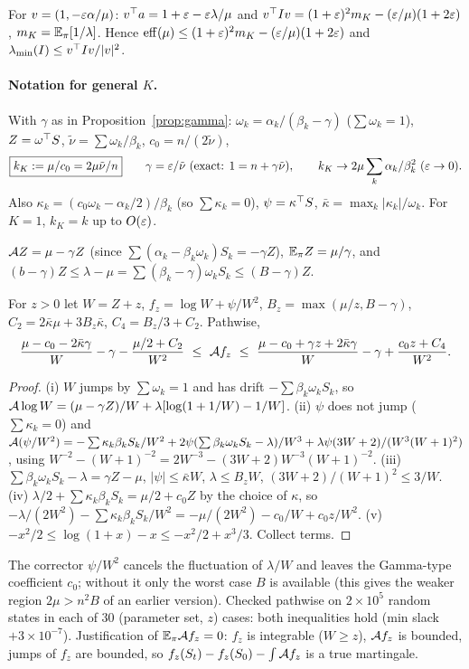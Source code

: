 \begin{proposition}\label{prop:ridge}\Pt{}
For $v=(1,-\varepsilon\alpha/\mu)$: $v^{\top} a=1+\varepsilon-\varepsilon\lambda/\mu$ and $v^{\top} Iv=(1+\varepsilon)^2m_K-(\varepsilon/\mu)(1+2\varepsilon)$, $m_K=\mathbb{E}_\pi[1/\lambda]$. Hence $\mathrm{eff}(\mu)\le(1+\varepsilon)^2m_K-(\varepsilon/\mu)(1+2\varepsilon)$ and $\lambda_{\min}(I)\le v^{\top} Iv/|v|^2$.
\end{proposition}

\paragraph{Notation for general $K$.}
With $\gamma$ as in Proposition~\ref{prop:gamma}: $\omega_k=\alpha_k/(\beta_k-\gamma)$ ($\sum\omega_k=1$), $Z=\omega^{\top} S$, $\tilde\nu=\sum\omega_k/\beta_k$, $c_0=n/(2\tilde\nu)$,
\[
\boxed{k_K:=\mu/c_0=2\mu\tilde\nu/n}\qquad\gamma=\eps/\tilde\nu\ \text{(exact: }1=n+\gamma\tilde\nu),\qquad k_K\to2\mu\sum_k\alpha_k/\beta_k^2\ (\eps\to0).
\]
Also $\kappa_k=(c_0\omega_k-\alpha_k/2)/\beta_k$ (so $\sum\kappa_k=0$), $\psi=\kappa^{\top} S$, $\bar\kappa=\max_k|\kappa_k|/\omega_k$. For $K=1$, $k_K=k$ up to $O(\varepsilon)$.

\begin{lemma}\label{lem:G}\Pt{}
$\mathcal A Z=\mu-\gamma Z$ (since $\sum(\alpha_k-\beta_k\omega_k)S_k=-\gamma Z$), $\mathbb{E}_\pi Z=\mu/\gamma$, and $(b-\gamma)Z\le\lambda-\mu=\sum(\beta_k-\gamma)\omega_kS_k\le(B-\gamma)Z$.
\end{lemma}

\begin{lemma}\label{lem:H}\Pt{}
For $z>0$ let $W=Z+z$, $f_z=\log W+\psi/W^2$, $B_z=\max(\mu/z,B-\gamma)$, $C_2=2\bar\kappa\mu+3B_z\bar\kappa$, $C_4=B_z/3+C_2$. Pathwise,
\[
\frac{\mu-c_0-2\bar\kappa\gamma}{W}-\gamma-\frac{\mu/2+C_2}{W^2}\ \le\ \cA f_z\ \le\ \frac{\mu-c_0+\gamma z+2\bar\kappa\gamma}{W}-\gamma+\frac{c_0z+C_4}{W^2}.
\]
\end{lemma}
\begin{proof}
(i) $W$ jumps by $\sum\omega_k=1$ and has drift $-\sum\beta_k\omega_kS_k$, so $\mathcal A\log W=(\mu-\gamma Z)/W+\lambda[\log(1+1/W)-1/W]$.
(ii) $\psi$ does not jump ($\sum\kappa_k=0$) and
$\mathcal A(\psi/W^2)=-\sum\kappa_k\beta_kS_k/W^2+2\psi(\sum\beta_k\omega_kS_k-\lambda)/W^3+\lambda\psi(3W+2)/(W^3(W+1)^2)$, using $W^{-2}-(W+1)^{-2}=2W^{-3}-(3W+2)W^{-3}(W+1)^{-2}$.
(iii) $\sum\beta_k\omega_kS_k-\lambda=\gamma Z-\mu$, $|\psi|\le\bar\kappa W$, $\lambda\le B_zW$, $(3W+2)/(W+1)^2\le3/W$.
(iv) $\lambda/2+\sum\kappa_k\beta_kS_k=\mu/2+c_0Z$ by the choice of $\kappa$, so $-\lambda/(2W^2)-\sum\kappa_k\beta_kS_k/W^2=-\mu/(2W^2)-c_0/W+c_0z/W^2$.
(v) $-x^2/2\le\log(1+x)-x\le-x^2/2+x^3/3$. Collect terms.
\end{proof}
The corrector $\psi/W^2$ cancels the fluctuation of $\lambda/W$ and leaves the Gamma-type coefficient $c_0$; without it only the worst case $B$ is available (this gives the weaker region $2\mu>n^2B$ of an earlier version).
Checked pathwise on $2\times10^5$ random states in each of $30$ (parameter set, $z$) cases: both inequalities hold (min slack $+3\times10^{-7}$).
Justification of $\mathbb{E}_\pi\mathcal A f_z=0$: $f_z$ is integrable ($W\ge z$), $\mathcal A f_z$ is bounded, jumps of $f_z$ are bounded, so $f_z(S_t)-f_z(S_0)-\int\mathcal A f_z$ is a true martingale.

